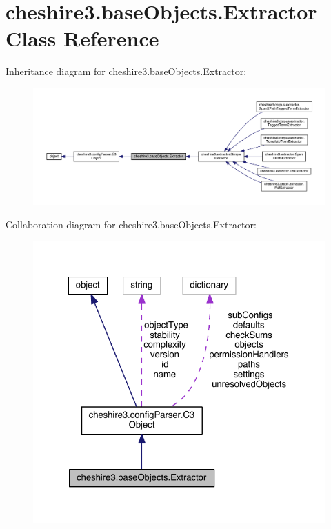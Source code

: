 \hypertarget{classcheshire3_1_1base_objects_1_1_extractor}{\section{cheshire3.\-base\-Objects.\-Extractor Class Reference}
\label{classcheshire3_1_1base_objects_1_1_extractor}
}


Inheritance diagram for cheshire3.\-base\-Objects.\-Extractor\-:
\nopagebreak
\begin{figure}[H]
\begin{center}
\leavevmode
\includegraphics[width=350pt]{classcheshire3_1_1base_objects_1_1_extractor__inherit__graph}
\end{center}
\end{figure}


Collaboration diagram for cheshire3.\-base\-Objects.\-Extractor\-:
\nopagebreak
\begin{figure}[H]
\begin{center}
\leavevmode
\includegraphics[width=325pt]{classcheshire3_1_1base_objects_1_1_extractor__coll__graph}
\end{center}
\end{figure}
